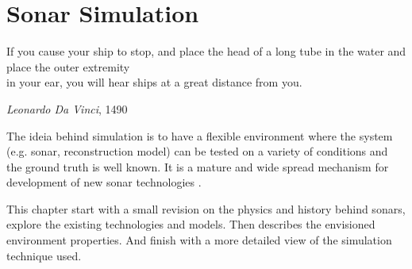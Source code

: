 \chapter{Sonar Simulation}

\epigraph{If you cause your ship to stop, and place the head of a long tube in
the water and place the outer extremity\\ in your ear, you will hear ships at a
great distance from you.}{\textit{Leonardo Da Vinci}, 1490}


The ideia behind simulation is to have a flexible environment where the system
(e.g. sonar, reconstruction model) can be tested on a variety of conditions
and the ground truth is well known. It is a mature and wide spread
mechanism for development of new sonar technologies \cite{Etter2013}.

This chapter start with a small revision on the physics and history behind
sonars, explore the existing technologies and models. Then describes the
envisioned environment properties. And finish with a more detailed view of
the simulation technique used.





